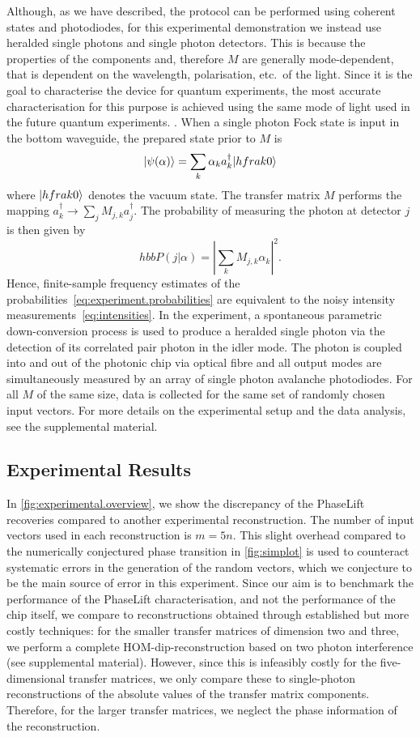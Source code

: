 Although, as we have described, the protocol can be performed using coherent states and photodiodes, for this experimental demonstration we instead use heralded single photons and single photon detectors.
This is because the properties of the components and, therefore $ M$ are generally mode-dependent, that is dependent on the wavelength, polarisation, etc.\ of the light.
Since it is the goal to characterise the device for quantum experiments, the most accurate characterisation for this purpose is achieved using the same mode of light used in the future quantum experiments. .
When a single photon Fock state is input in the bottom waveguide, the prepared state prior to $ M$ is
\[
  \ket{\psi({\alpha})} = \sum_k \alpha_k a_k^{\dag} \ket{hfrak{0}}
\]
where $\ket{hfrak{0}}$ denotes the vacuum state.
The transfer matrix $M$ performs the mapping $a_k^{\dag} \rightarrow \sum_j M_{j,k}a_j^{\dag}$.
The probability of measuring the photon at detector $j$ is then given by
\[
  hbb{P}(j|{\alpha}) = \left| \sum_k M_{j,k} \alpha_k \right|^2.
  \label{eq:experiment.probabilities}
\]
Hence, finite-sample frequency estimates of the probabilities~\eqref{eq:experiment.probabilities} are equivalent to the noisy intensity measurements~\eqref{eq:intensities}.
In the experiment, a spontaneous parametric down-conversion process is used to produce a heralded single photon via the detection of its correlated pair photon in the idler mode.
The photon is coupled into and out of the photonic chip via optical fibre and all output modes are simultaneously measured by an array of single photon avalanche photodiodes.
For all $ M$ of the same size, data is collected for the same set of randomly chosen input vectors.
For more details on the experimental setup and the data analysis, see the supplemental material.\\



\subsection{Experimental Results}
In \cref{fig:experimental.overview}, we show the discrepancy of the PhaseLift recoveries compared to another experimental reconstruction.
The number of input vectors used in each reconstruction is $m = 5n$.
This slight overhead compared to the numerically conjectured phase transition in \cref{fig:simplot} is used to counteract systematic errors in the generation of the random vectors, which we conjecture to be the main source of error in this experiment.
Since our aim is to benchmark the performance of the PhaseLift characterisation, and not the performance of the chip itself, we compare to reconstructions obtained through established but more costly techniques: for the smaller transfer matrices of dimension two and three, we perform a complete HOM-dip-reconstruction based on two photon interference (see supplemental material).
However, since this is infeasibly costly for the five-dimensional transfer matrices, we only compare these to single-photon reconstructions of the absolute values of the transfer matrix components.
Therefore, for the larger transfer matrices, we neglect the phase information of the reconstruction.

